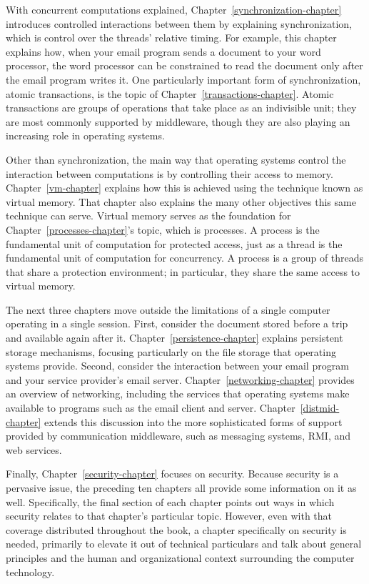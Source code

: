 With concurrent computations explained,
Chapter~\ref{synchronization-chapter} introduces controlled
interactions between them by explaining synchronization, which is
control over the threads' relative timing.  For example, this chapter
explains how, when your email program sends a document to your word
processor, the word processor can be constrained to read the document
only after the email program writes it.   One particularly important form of
synchronization, atomic transactions, is the topic of
Chapter~\ref{transactions-chapter}.  Atomic transactions are groups of
operations that take place as an indivisible unit; they are most
commonly supported by middleware, though they are also playing an
increasing role in operating systems.

Other than synchronization, the main way that operating systems
control the interaction between computations is by controlling their
access to memory.  Chapter~\ref{vm-chapter} explains how this is
achieved using the technique known as virtual memory.  That chapter
also explains the many other objectives this same technique can serve.
Virtual memory serves as the foundation for
Chapter~\ref{processes-chapter}'s topic, which is processes.  A process is the
fundamental unit of computation for protected access, just as a thread
is the fundamental unit of computation for concurrency.  A process is
a group of threads that share a protection environment; in particular,
they share the same access to virtual memory.

The next three chapters move outside the limitations of a single computer
operating in a single session.  First, consider the document stored
before a trip and available again after it.
Chapter~\ref{persistence-chapter} explains persistent storage
mechanisms, focusing particularly on the file storage that operating
systems provide.  Second, consider the interaction between your
email program and your service provider's email server.
Chapter~\ref{networking-chapter} provides an overview of networking,
including the services that operating systems make available to
programs such as the email client and server.
Chapter~\ref{distmid-chapter} extends this discussion into the more
sophisticated forms of support provided by communication middleware,
such as messaging systems, RMI, and web services.

Finally, Chapter~\ref{security-chapter} focuses on security.  Because
security is a pervasive issue, the preceding ten chapters all provide
some information on it as well.  Specifically, the final section of
each chapter points out ways in which security relates to that
chapter's particular topic.  However, even with that coverage
distributed throughout the book, a chapter specifically on security is
needed, primarily to elevate it out of technical particulars and talk
about general principles and the human and organizational context
surrounding the computer technology.

